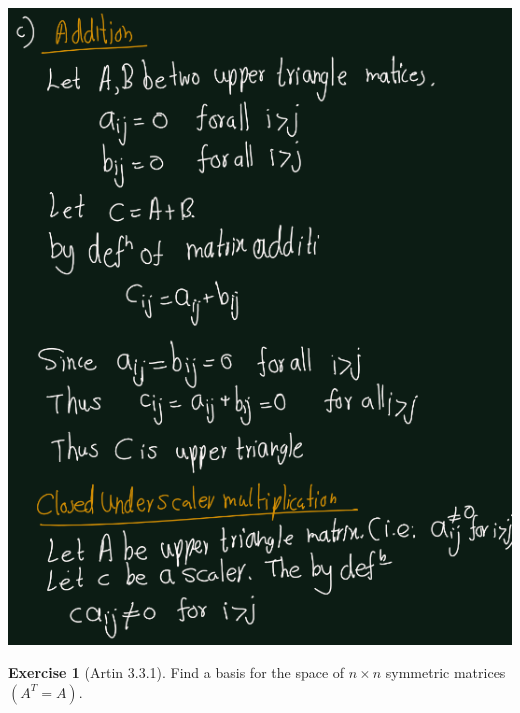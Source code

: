 \documentclass[
]{book}
\theoremstyle{definition}
\theoremstyle{definition}
\theoremstyle{definition}
\newtheorem{exercise}{Exercise}[chapter]
\theoremstyle{definition}
\theoremstyle{remark}
\begin{document}
\includegraphics{figures/ch_3/ex-2.2-c.png}

\begin{exercise}[Artin 3.3.1]
\protect\hypertarget{exr:unnamed-chunk-283}{}\label{exr:unnamed-chunk-283}Find a basis for the space of \(n \times n\) symmetric matrices \((A^T = A)\).
\end{exercise}
\end{document}
